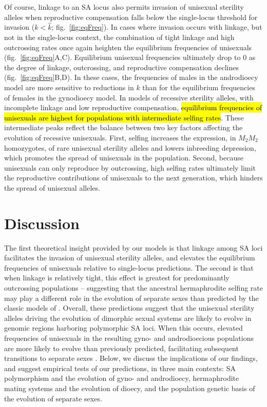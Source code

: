 \documentclass{article}
\begin{document}
Of course, linkage to an SA locus also permits invasion of unisexual sterility alleles when reproductive compensation falls below the single-locus threshold for invasion ($k < \hat{k}$; fig.~\ref{fig:eqFreq}). In cases where invasion occurs with linkage, but not in the single-locus context, the combination of tight linkage and high outcrossing rates once again heighten the equilibrium frequencies of unisexuals (fig.~\ref{fig:eqFreq}A,C). Equilibrium unisexual frequencies ultimately drop to $0$ as the degree of linkage, outcrossing, and reproductive compensation declines (fig.~\ref{fig:eqFreq}B,D). In these cases, the frequencies of males in the androdioecy model are more sensitive to reductions in $k$ than for the equilibrium frequencies of females in the gynodioecy model. In models of recessive sterility alleles, with incomplete linkage and low reproductive compensation, \hl{equilibrium frequencies of unisexuals are highest for populations with intermediate selfing rates}. These intermediate peaks reflect the balance between two key factors affecting the evolution of recessive unisexuals. First, selfing increases the expression, in $M_2 M_2$ homozygotes, of rare unisexual sterility alleles and lowers inbreeding depression, which promotes the spread of unisexuals in the population. Second, because unisexuals can only reproduce by outcrossing, high selfing rates ultimately limit the reproductive contributions of unisexuals to the next generation, which hinders the spread of unisexual alleles. 





\section*{Discussion}

The first theoretical insight provided by our models is that linkage among SA loci facilitates the invasion of unisexual sterility alleles, and elevates the equilibrium frequencies of unisexuals relative to single-locus predictions. The second is that when linkage is relatively tight, this effect is greatest for predominantly outcrossing populations -- suggesting that the ancestral hermaphrodite selfing rate may play a different role in the evolution of separate sexes than predicted by the classic models of \citet{Charlesworth1978a}. Overall, these predictions suggest that the unisexual sterility alleles driving the evolution of dimorphic sexual systems are likely to evolve in genomic regions harboring polymorphic SA loci. When this occurs, elevated frequencies of unisexuals in the resulting gyno- and androdioecious populations are more likely to evolve than previously predicted, facilitating subsequent transitions to separate sexes \citep{Charlesworth1978a}. Below, we discuss the implications of our findings, and suggest empirical tests of our predictions, in three main contexts: SA polymorphism and the evolution of gyno- and androdioecy, hermaphrodite mating systems and the evolution of dioecy, and the population genetic basis of the evolution of separate sexes.
\end{document}
